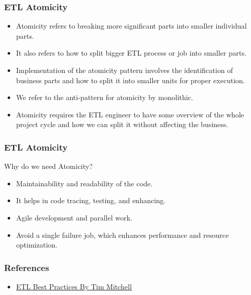 \begin{frame}
	\frametitle{ETL Atomicity}
	\begin{itemize}[<+->]
		\item Atomicity refers to breaking more significant parts into smaller individual parts.
		\item It also refers to how to split bigger ETL process or job into smaller parts.
		\item Implementation of the atomicity pattern involves the identification of business parts and how to split it into smaller units for proper execution.
		\item We refer to the anti-pattern for atomicity by monolithic.
		\item Atomicity requires the ETL engineer to have some overview of the whole project cycle and how we can split it without affecting the business.
	\end{itemize}
\end{frame}
\begin{frame}
	\frametitle{ETL Atomicity}
	Why do we need Atomicity?
	\begin{itemize}[<+->]
		\item Maintainability and readability of the code.
		\item It helps in code tracing, testing, and enhancing.
		\item Agile development and parallel work.
		\item Avoid a single failure job, which enhances performance and resource optimization.
	\end{itemize}
\end{frame}




\begin{frame}
	\frametitle{References}
	\begin{itemize}[<+->]
		\item \href{https://www.timmitchell.net/etl-best-practices/}{ETL Best Practices By Tim Mitchell}
	\end{itemize}

\end{frame}





